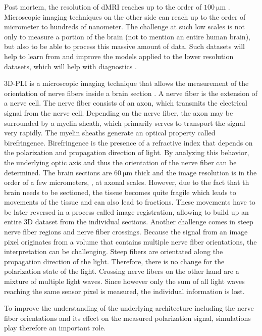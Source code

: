 Post mortem, the resolution of \ac{dMRI} reaches up to the order of $\SI{100}{\micro\meter}$ \cite{beaujoin:hal-02876136}.
Microscopic imaging techniques on the other side can reach up to the order of micrometer to hundreds of nanometer.
The challenge at such low scales is not only to measure a portion of the brain (not to mention an entire human brain), but also to be able to process this massive amount of data.
Such datasets will help to learn from and improve the models applied to the lower resolution datasets, which will help with \eg{} diagnostics \cite{Yendiki2021}.
\par
%
\ac{3D-PLI} is a microscopic imaging technique that allows the measurement of the orientation of nerve fibers inside a brain section \cite{Axer2011a, Axer2011, Axer2016}.
A nerve fiber is the extension of a nerve cell.
The nerve fiber consists of an axon, which transmits the electrical signal from the nerve cell.
Depending on the nerve fiber, the axon may be surrounded by a myelin sheath, which primarily serves to transport the signal very rapidly.
The myelin sheaths generate an optical property called birefringence.
Birefringence is the presence of a refractive index that depends on the polarization and propagation direction of light.
By analyzing this behavior, the underlying optic axis and thus the orientation of the nerve fiber can be determined.
The brain sections are $\SI{60}{\micro\meter}$ thick and the image resolution is in the order of a few micrometers, \ie{}, at axonal scales.
However, due to the fact that th brain needs to be sectioned, the tissue becomes quite fragile which leads to movements of the tissue and can also lead to fractions.
These movements have to be later reversed in a process called image registration, allowing to build up an entire 3D dataset from the individual sections.
Another challenge comes in steep nerve fiber regions and nerve fiber crossings.
Because the signal from an image pixel originates from a volume that contains multiple nerve fiber orientations, the interpretation can be challenging.
Steep fibers are \eg{} orientated along the propagation direction of the light.
Therefore, there is no change for the polarization state of the light.
Crossing nerve fibers on the other hand are a mixture of multiple light waves.
Since however only the sum of all light waves reaching the same sensor pixel is measured, the individual information is lost.
\par
%
To improve the understanding of the underlying architecture including the nerve fiber orientations and its effect on the measured polarization signal, simulations play therefore an important role.

